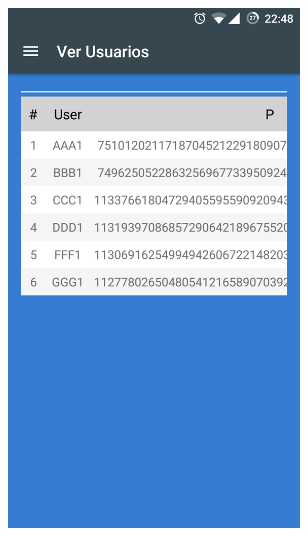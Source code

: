 \documentclass[../PFC.tex]{subfiles}
\begin{document}

\begin{figure}[H]
\centering
	\begin{subfigure}{0.4\textwidth}
		\centering
		\includegraphics[width=0.85\textwidth]{./img/app/verUsuarios}
    \end{subfigure}          
    \qquad\qquad\qquad  %
    \begin{subfigure}{0.4\textwidth}  

\end{subfigure}
\end{figure}
\end{document}
